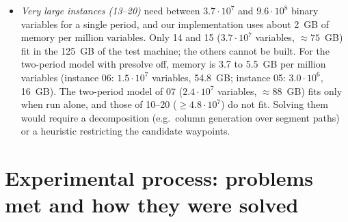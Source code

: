 \documentclass[11pt,a4paper]{article}
\begin{document}
\begin{itemize}
on instance 04 it was still in presolve after more than three hours with a one-hour limit. Removing (4) or switching
presolve off restores the time limit, so all runs of Table~\ref{tab:p01} use presolve off. Table~\ref{tab:p01on}
gives the runs made before this change on the small instances, with presolve on. On instance 02 the link down at period 1
makes the no-waypoint MLU $1.098$ (congestion); with presolve on only 2 of the 10 seeds find and prove the optimum
$0.903$ (in 114~s and 3307~s), the others stop at the time limit with MLU between $1.043$ and $1.098$, which shows how
much the solver's search path matters on this instance. With presolve off, 7 of the 10 seeds prove the same optimum $0.903$ (instance 03: 3 of 10, against 4 of 10 with
presolve on). On instance 04 no seed proves optimality but every run improves the MIP start ($1.000\to0.898$ on
average, best $0.645$, bound $0.581$). On instance 05, 2 of the 10 seeds find $0.323$ (no-waypoint $1.000$, bound $0.205$), the
other 8 keep the MIP start; runs take between 3684~s and 10049~s for a 3600~s limit.
On instance 06 ($1.5\cdot10^7$ variables) the five runs finished so far keep the MIP start ($1.000$) without any
lower bound (gap 100\%), in 3875--3945~s. Instances 09 (5 runs) and 08 (1 run so far) also keep the MIP start;
some seeds reach a lower bound ($0.850$ on 09, $0.319$ on 08), so the gap is not always 100\%.
\item \emph{Very large instances (13--20)} need between $3.7\cdot10^7$ and $9.6\cdot10^8$ binary variables for a
single period, and our implementation uses about 2~GB of memory per million variables. Only 14 and 15
($3.7\cdot10^7$ variables, $\approx 75$~GB) fit in the 125~GB of the test machine; the others cannot be built.
For the two-period model with presolve off, memory is 3.7 to 5.5~GB per million variables
(instance 06: $1.5\cdot10^7$ variables, 54.8~GB; instance 05: $3.0\cdot10^6$, 16~GB). The two-period model of 07
($2.4\cdot10^7$ variables, $\approx88$~GB) fits only when run alone, and those of 10--20 ($\ge4.8\cdot10^7$) do not fit.
Solving them would require a decomposition (e.g.\ column generation over segment paths) or a heuristic
restricting the candidate waypoints.
\end{itemize}

\section{Experimental process: problems met and how they were solved}\label{sec:process}
\end{document}
